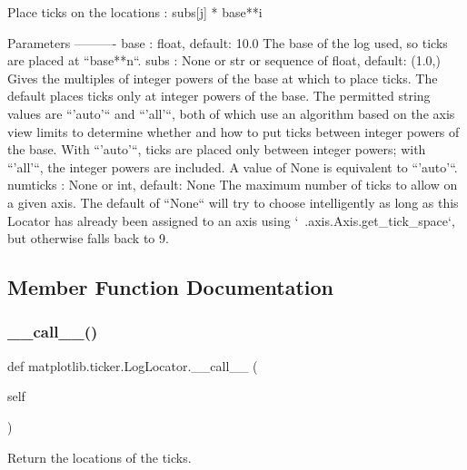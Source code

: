 \begin{DoxyVerb}Place ticks on the locations : subs[j] * base**i

Parameters
----------
base : float, default: 10.0
    The base of the log used, so ticks are placed at ``base**n``.
subs : None or str or sequence of float, default: (1.0,)
    Gives the multiples of integer powers of the base at which
    to place ticks.  The default places ticks only at
    integer powers of the base.
    The permitted string values are ``'auto'`` and ``'all'``,
    both of which use an algorithm based on the axis view
    limits to determine whether and how to put ticks between
    integer powers of the base.  With ``'auto'``, ticks are
    placed only between integer powers; with ``'all'``, the
    integer powers are included.  A value of None is
    equivalent to ``'auto'``.
numticks : None or int, default: None
    The maximum number of ticks to allow on a given axis. The default
    of ``None`` will try to choose intelligently as long as this
    Locator has already been assigned to an axis using
    `~.axis.Axis.get_tick_space`, but otherwise falls back to 9.
\end{DoxyVerb}
 

\subsection{Member Function Documentation}
\mbox{\label{classmatplotlib_1_1ticker_1_1LogLocator_a7cdff5eaec6ed65b4777dc10e45b1937}} 
\subsubsection{\texorpdfstring{\+\_\+\+\_\+call\+\_\+\+\_\+()}{\_\_call\_\_()}}
{\footnotesize\ttfamily def matplotlib.\+ticker.\+Log\+Locator.\+\_\+\+\_\+call\+\_\+\+\_\+ (\begin{DoxyParamCaption}\item[{}]{self }\end{DoxyParamCaption})}

\begin{DoxyVerb}Return the locations of the ticks.\end{DoxyVerb}
 \mbox{\label{classmatplotlib_1_1ticker_1_1LogLocator_a8947a585727641d29da009762eb0112f}} 
